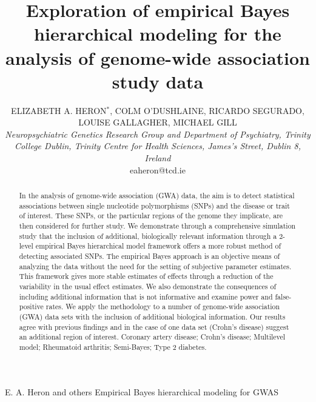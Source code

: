 \documentclass[oupdraft]{bio}
\begin{document}
\title{Exploration of empirical Bayes hierarchical modeling for the
analysis of genome-wide association study data}

\author{ELIZABETH A. HERON$^\ast$, COLM O'DUSHLAINE, RICARDO SEGURADO,\\
LOUISE GALLAGHER, MICHAEL GILL\\[4pt]
\textit{Neuropsychiatric Genetics Research Group and Department of Psychiatry,
Trinity College Dublin,
Trinity Centre for Health Sciences,
James's Street, Dublin 8,
Ireland}
\\[2pt]
{eaheron@tcd.ie}}

\markboth%
{E. A. Heron and others}
{Empirical Bayes hierarchical modeling for GWAS}

\maketitle


\begin{abstract}
{In the analysis of genome-wide association (GWA) data, the aim is
to detect statistical associations between single nucleotide
polymorphisms (SNPs) and the disease or trait of interest. These
SNPs, or the particular regions of the genome they implicate, are
then considered for further study. We demonstrate through a
comprehensive simulation study that the inclusion of additional,
biologically relevant information through a 2-level
empirical Bayes hierarchical model framework offers a more robust
method of detecting associated SNPs. The empirical Bayes approach
is an objective means of analyzing the data without the need for
the setting of subjective parameter estimates. This framework
gives more stable estimates of effects through a reduction of the
variability in the usual effect estimates. We also demonstrate the
consequences of including additional information that is not
informative and examine power and false-positive rates. We apply
the methodology to a number of genome-wide association (GWA)
data sets with the inclusion of additional biological information.
Our results agree with previous findings and in the case of one
data set (Crohn's disease) suggest an additional region of interest.}
{Coronary artery disease; Crohn's disease; Multilevel model;
Rheumatoid arthritis; Semi-Bayes; Type 2 diabetes.}
\end{abstract}
\end{document}
